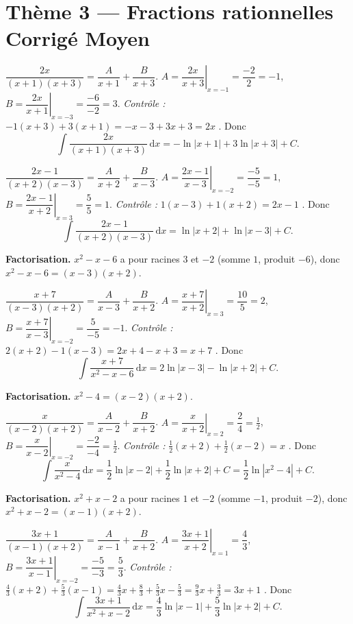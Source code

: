 \documentclass[11pt,a4paper]{article}
\newcommand{\dd}{\mathrm{d}}
\begin{document}
\section*{Thème 3 — Fractions rationnelles \quad\textbullet\quad Corrigé Moyen}

\begin{corr}[1]
$\dfrac{2x}{(x+1)(x+3)}=\dfrac{A}{x+1}+\dfrac{B}{x+3}$.
$A=\left.\dfrac{2x}{x+3}\right|_{x=-1}=\dfrac{-2}{2}=-1$,
$B=\left.\dfrac{2x}{x+1}\right|_{x=-3}=\dfrac{-6}{-2}=3$.
\emph{Contrôle :} $-1(x+3)+3(x+1)=-x-3+3x+3=2x$ \checkmark. Donc
\[
\int \frac{2x}{(x+1)(x+3)}\,\dd x=-\ln|x+1|+3\ln|x+3|+C.
\]
\end{corr}

\begin{corr}[2]
$\dfrac{2x-1}{(x+2)(x-3)}=\dfrac{A}{x+2}+\dfrac{B}{x-3}$.
$A=\left.\dfrac{2x-1}{x-3}\right|_{x=-2}=\dfrac{-5}{-5}=1$,
$B=\left.\dfrac{2x-1}{x+2}\right|_{x=3}=\dfrac{5}{5}=1$.
\emph{Contrôle :} $1(x-3)+1(x+2)=2x-1$ \checkmark. Donc
\[
\int \frac{2x-1}{(x+2)(x-3)}\,\dd x=\ln|x+2|+\ln|x-3|+C.
\]
\end{corr}

\begin{corr}[3]
\textbf{Factorisation.} $x^2-x-6$ a pour racines $3$ et $-2$ (somme $1$, produit $-6$), donc
$x^2-x-6=(x-3)(x+2)$.

\smallskip
$\dfrac{x+7}{(x-3)(x+2)}=\dfrac{A}{x-3}+\dfrac{B}{x+2}$.
$A=\left.\dfrac{x+7}{x+2}\right|_{x=3}=\dfrac{10}{5}=2$,
$B=\left.\dfrac{x+7}{x-3}\right|_{x=-2}=\dfrac{5}{-5}=-1$.
\emph{Contrôle :} $2(x+2)-1(x-3)=2x+4-x+3=x+7$ \checkmark. Donc
\[
\int \frac{x+7}{x^2-x-6}\,\dd x=2\ln|x-3|-\ln|x+2|+C.
\]
\end{corr}

\begin{corr}[4]
\textbf{Factorisation.} $x^2-4=(x-2)(x+2)$.

\smallskip
$\dfrac{x}{(x-2)(x+2)}=\dfrac{A}{x-2}+\dfrac{B}{x+2}$.
$A=\left.\dfrac{x}{x+2}\right|_{x=2}=\dfrac{2}{4}=\tfrac12$,
$B=\left.\dfrac{x}{x-2}\right|_{x=-2}=\dfrac{-2}{-4}=\tfrac12$.
\emph{Contrôle :} $\tfrac12(x+2)+\tfrac12(x-2)=x$ \checkmark. Donc
\[
\int \frac{x}{x^2-4}\,\dd x=\frac12\ln|x-2|+\frac12\ln|x+2|+C
=\frac12\ln|x^2-4|+C.
\]
\end{corr}

\begin{corr}[5]
\textbf{Factorisation.} $x^2+x-2$ a pour racines $1$ et $-2$ (somme $-1$, produit $-2$), donc
$x^2+x-2=(x-1)(x+2)$.

\smallskip
$\dfrac{3x+1}{(x-1)(x+2)}=\dfrac{A}{x-1}+\dfrac{B}{x+2}$.
$A=\left.\dfrac{3x+1}{x+2}\right|_{x=1}=\dfrac{4}{3}$,
$B=\left.\dfrac{3x+1}{x-1}\right|_{x=-2}=\dfrac{-5}{-3}=\dfrac53$.
\emph{Contrôle :} $\tfrac43(x+2)+\tfrac53(x-1)=\tfrac43x+\tfrac83+\tfrac53x-\tfrac53
=\tfrac{9}{3}x+\tfrac{3}{3}=3x+1$ \checkmark. Donc
\[
\int \frac{3x+1}{x^2+x-2}\,\dd x=\frac43\ln|x-1|+\frac53\ln|x+2|+C.
\]
\end{corr}
\end{document}
